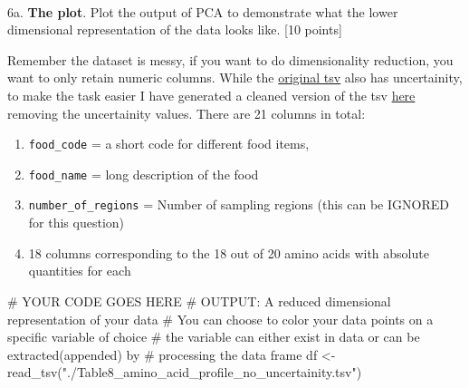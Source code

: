 \documentclass[
  letterpaper,
  DIV=11,
  numbers=noendperiod]{scrartcl}
\makeatletter
\let\oldparagraph\paragraph
\renewcommand{\paragraph}{
    \@ifstar
      \xxxParagraphStar
      \xxxParagraphNoStar
  }
\newcommand{\xxxParagraphStar}[1]{\oldparagraph*{#1}\mbox{}}
\newcommand{\xxxParagraphNoStar}[1]{\oldparagraph{#1}\mbox{}}
\newenvironment{Shaded}{\begin{snugshade}}{\end{snugshade}}
\newcommand{\CommentTok}[1]{\textcolor[rgb]{0.37,0.37,0.37}{#1}}
\newcommand{\FunctionTok}[1]{\textcolor[rgb]{0.28,0.35,0.67}{#1}}
\newcommand{\NormalTok}[1]{\textcolor[rgb]{0.00,0.23,0.31}{#1}}
\newcommand{\OtherTok}[1]{\textcolor[rgb]{0.00,0.23,0.31}{#1}}
\newcommand{\StringTok}[1]{\textcolor[rgb]{0.13,0.47,0.30}{#1}}
\providecommand{\tightlist}{%
  \setlength{\itemsep}{0pt}\setlength{\parskip}{0pt}}\usepackage{longtable,booktabs,array}
\makeatother
\begin{document}
\paragraph{\texorpdfstring{6a. \textbf{The plot}. Plot the output of PCA
to demonstrate what the lower dimensional representation of the data
looks like. {[}10
points{]}}{6a. The plot. Plot the output of PCA to demonstrate what the lower dimensional representation of the data looks like. {[}10 points{]}}}\label{a.-the-plot.-plot-the-output-of-pca-to-demonstrate-what-the-lower-dimensional-representation-of-the-data-looks-like.-10-points}

Remember the dataset is messy, if you want to do dimensionality
reduction, you want to only retain numeric columns. While the
\href{https://drive.google.com/file/d/1e4eApFj1YbTgzPuIv9KK0TyJtKsG_5JO/view?usp=sharing}{original
tsv} also has uncertainity, to make the task easier I have generated a
cleaned version of the tsv
\href{https://drive.google.com/file/d/1rKkfJO2unnTGvBRpKLPi-jnMnYEnKCCb/view?usp=sharing}{here}
removing the uncertainity values. There are 21 columns in total:

\begin{enumerate}
\def\labelenumi{\arabic{enumi}.}
\tightlist
\item
  \texttt{food\_code} = a short code for different food items,
\item
  \texttt{food\_name} = long description of the food
\item
  \texttt{number\_of\_regions} = Number of sampling regions (this can be
  IGNORED for this question)
\item
  18 columns corresponding to the 18 out of 20 amino acids with absolute
  quantities for each
\end{enumerate}

\begin{Shaded}
\begin{Highlighting}[]
\CommentTok{\# YOUR CODE GOES HERE}
\CommentTok{\# OUTPUT: A reduced dimensional representation of your data}
\CommentTok{\# You can choose to color your data points on a specific variable of choice}
\CommentTok{\# the variable can either exist in data or can be extracted(appended) by}
\CommentTok{\# processing the data frame}
\NormalTok{df }\OtherTok{\textless{}{-}} \FunctionTok{read\_tsv}\NormalTok{(}\StringTok{"./Table8\_amino\_acid\_profile\_no\_uncertainity.tsv"}\NormalTok{)}
\end{Highlighting}
\end{Shaded}
\end{document}
